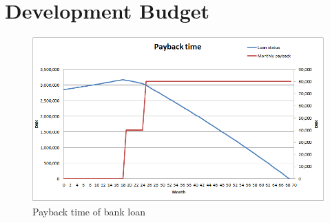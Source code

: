 \section{Development Budget}
\label{development_budget}

\begin{figure}[h]
\includegraphics[width=\textwidth]{graphics/Paybacktime}
\caption{Payback time of bank loan}
\end{figure}

